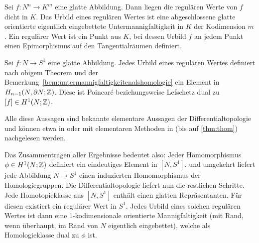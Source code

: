 	\begin{thm}
		Sei $f:N^n \to K^m$ eine glatte Abbildung. Dann liegen die regulären Werte von $f$ dicht in $K$. Das Urbild eines regulären Wertes ist eine abgeschlossene glatte orientierte eigentlich eingebettete Untermannigfaltigkeit in $K$ der Kodimension $m$. Ein regulärer Wert ist ein Punkt aus $K$, bei dessen Urbild $f$ an jedem Punkt einen Epimorphismus auf den Tangentialräumen definiert. 
	\end{thm}
	\begin{thm}[Thom]
	\label{thm:thom}
		Sei $f:N \to S^1$ eine glatte Abbildung. Jedes Urbild eines regulären Wertes definiert nach obigem Theorem und der Bemerkung~\ref{bem:untermannigfaltigkeitenalshomologie} ein Element in $H_{n-1}(N,\partial N;\mathbb{Z})$. Diese ist Poincaré beziehungsweise Lefschetz dual zu $[f]\in H^1(N;\mathbb{Z})$.
	\end{thm}
	Alle diese Aussagen sind bekannte elementare Aussagen der Differentialtopologie und können etwa in \cite{Kreck.2010} oder mit elementaren Methoden in \cite{Hirsch.1991} (bis auf \ref{thm:thom}) nachgelesen werden. 

	Das Zusammentragen aller Ergebnisse bedeutet also: Jeder Homomorphismus $\phi \in H^1(N;\mathbb{Z})$ definiert ein eindeutiges Element in $[N,S^1]$. und umgekehrt liefert jede Abbildung $N\to S^1$ einen induzierten Homomorphismus der Homologiegruppen. Die Differentialtopologie liefert nun die restlichen Schritte. Jede Homotopieklasse aus $[N,S^1]$ enthält einen glatten Repräsentanten. Für diesen existiert ein regulärer Wert in $S^1$. Jedes Urbild eines solchen regulären Wertes ist dann eine 1-kodimensionale orientierte Mannigfaltigkeit (mit Rand, wenn überhaupt, im Rand von $N$ eigentlich eingebettet), welche als Homologieklasse dual zu $\phi$ ist.

